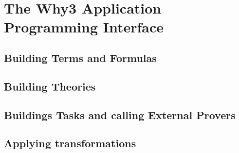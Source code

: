 \chapter{The Why3 Application Programming Interface}

\section{Building Terms and Formulas}

\section{Building Theories}

\section{Buildings Tasks and calling External Provers}

\section{Applying transformations}

